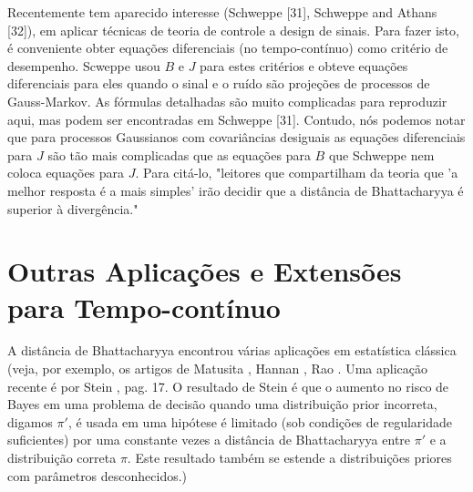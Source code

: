 \documentclass{sbrt2017port}
\begin{document}
Recentemente tem aparecido interesse (Schweppe [31], Schweppe and Athans [32]), em aplicar técnicas de teoria de controle a design de sinais. Para fazer isto, é conveniente obter equações diferenciais (no tempo-contínuo) como critério de desempenho. Scweppe usou $B$ e $J$ para estes critérios e obteve equações diferenciais para eles quando o sinal e o ruído são projeções de processos de Gauss-Markov. As fórmulas detalhadas são muito complicadas para reproduzir aqui, mas podem ser encontradas em Schweppe [31]. Contudo, nós podemos notar que para processos Gaussianos com covariâncias desiguais as equações diferenciais para $J$ são tão mais complicadas que as equações para $B$ que Schweppe nem coloca equações para $J$. Para citá-lo, "leitores que compartilham da teoria que 'a melhor resposta é a mais simples' irão decidir que a distância de Bhattacharyya é superior à divergência."

\section{Outras Aplicações e Extensões para Tempo-contínuo} \label{sec5}

A distância de Bhattacharyya encontrou várias aplicações em estatística clássica (veja, por exemplo, os artigos de Matusita \cite{r33}, Hannan \cite{r34}, Rao \cite{r35}. Uma aplicação recente é por Stein \cite{r36}, pag. 17. O resultado de Stein é que o aumento no risco de Bayes em uma problema de decisão quando uma distribuição prior incorreta, digamos $\pi'$, é usada em uma hipótese é limitado (sob condições de regularidade suficientes) por uma constante vezes a distância de Bhattacharyya entre $\pi'$ e a distribuição correta $\pi$. Este resultado também se estende a distribuições priores com parâmetros desconhecidos.)
\end{document}
